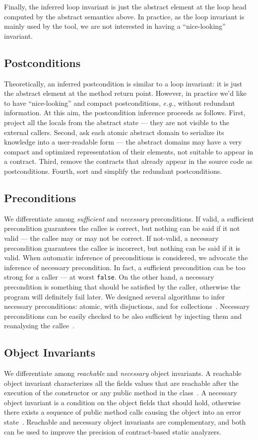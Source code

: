 \documentclass{sig-alternate-2013}
\begin{document}
Finally, the inferred loop invariant is just the abstract element at the loop head computed by the abstract semantics above.
In practice, as the loop invariant is mainly used by the tool, we are not interested in having a ``nice-looking'' invariant.

\subsection{Postconditions}
Theoretically, an inferred postcondition is similar to a loop invariant: it is just the abstract element at the method return point.
However, in practice we'd like to have ``nice-looking'' and compact postconditions, \emph{e.g.}, without redundant information.
At this aim, the postcondition inference proceeds as follows.
First, project all the locals from the abstract state --- they are not visible to the external callers.
Second, ask each atomic abstract domain to serialize its knowledge into a user-readable form --- the abstract domains may have a very compact and optimized representation of their elements, not suitable to appear in a contract.
Third, remove the contracts that already appear in the source code as postconditions.
Fourth, sort and simplify the redundant postconditions.

\subsection{Preconditions}
We differentiate among \emph{sufficient} and \emph{necessary} preconditions.
If valid, a sufficient precondition guarantees the callee is correct, but nothing can be said if it not valid --- the callee may or may not be correct. 
If not-valid, a necessary precondition guarantees the callee is incorrect, but nothing can be said if it is valid.
When automatic inference of preconditions is considered, we advocate the inference of necessary precondition.
In fact, a sufficient precondition can be too strong for a caller --- at worst \texttt{false}.
On the other hand, a necessary precondition is something that should be satisfied by the caller, otherwise the program will definitely fail later.
We designed several algorithms to infer necessary preconditions: atomic, with disjuctions, and for collections~\cite{CousotCousotLogozzo11}.
Necessary preconditions can be easily checked to be also sufficient by injecting them and reanalysing the callee~\cite{CousotCousotFahndrichLogozzo13}.


\subsection{Object Invariants}
We differentiate among \emph{reachable} and \emph{necessary} object invariants.
A reachable object invariant characterizes all the fields values that are reachable after the execution of the constructor or any public method in the class~\cite{Logozzo-PhD}.
A necessary object invariant is a condition on the object fields that should hold, otherwise there exists a sequence of public method calls causing the object into an error state~\cite{BouazizLogozzoFahndrich12}.
Reachable and necessary object invariants are complementary, and both can be used to improve the precision of contract-based static analyzers.
\end{document}
